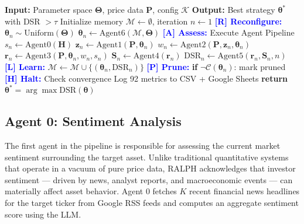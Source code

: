 \documentclass[conference]{IEEEtran}
\begin{document}
\begin{algorithm}[h!]
\caption{The RALPH Loop}
\label{alg:ralph}
\begin{algorithmic}[1]
\State \textbf{Input:} Parameter space $\boldsymbol{\Theta}$, price data $\mathbf{P}$, config $\mathcal{K}$
\State \textbf{Output:} Best strategy $\boldsymbol{\theta}^*$ with DSR $> \tau$
\State Initialize memory $\mathcal{M} \leftarrow \emptyset$, iteration $n \leftarrow 1$
    \State \textcolor{blue}{\textbf{[R] Reconfigure:}}
        \State $\boldsymbol{\theta}_n \sim \text{Uniform}(\boldsymbol{\Theta})$ 
    \Else
        \State $\boldsymbol{\theta}_n \leftarrow \text{Agent6}(\mathcal{M}, \boldsymbol{\Theta})$ 
    \EndIf
    \State \textcolor{blue}{\textbf{[A] Assess:}} Execute Agent Pipeline
    \State $s_n \leftarrow \text{Agent0}(\mathbf{H})$ 
    \State $\mathbf{z}_n \leftarrow \text{Agent1}(\mathbf{P}, \boldsymbol{\theta}_n)$ 
    \State $w_n \leftarrow \text{Agent2}(\mathbf{P}, \mathbf{z}_n, \boldsymbol{\theta}_n)$ 
    \State $\mathbf{r}_n \leftarrow \text{Agent3}(\mathbf{P}, \boldsymbol{\theta}_n, w_n, s_n)$ 
    \State $\mathbf{S}_n \leftarrow \text{Agent4}(\mathbf{r}_n)$ 
    \State $\text{DSR}_n \leftarrow \text{Agent5}(\mathbf{r}_n, \mathbf{S}_n, n)$ 
    \State \textcolor{blue}{\textbf{[L] Learn:}} $\mathcal{M} \leftarrow \mathcal{M} \cup \{(\boldsymbol{\theta}_n, \text{DSR}_n)\}$
    \State \textcolor{blue}{\textbf{[P] Prune:}} \textbf{if} $\neg\mathcal{C}(\boldsymbol{\theta}_n)$: mark pruned
    \State \textcolor{blue}{\textbf{[H] Halt:}} Check convergence
    \State Log 92 metrics to CSV + Google Sheets
\EndWhile
\State \textbf{return} $\boldsymbol{\theta}^* = \arg\max \text{DSR}(\boldsymbol{\theta})$
\end{algorithmic}
\end{algorithm}

\subsection{Agent 0: Sentiment Analysis}

The first agent in the pipeline is responsible for assessing the current market sentiment surrounding the target asset. Unlike traditional quantitative systems that operate in a vacuum of pure price data, RALPH acknowledges that investor sentiment --- driven by news, analyst reports, and macroeconomic events --- can materially affect asset behavior. Agent 0 fetches $K$ recent financial news headlines for the target ticker from Google RSS feeds and computes an aggregate sentiment score using the LLM.
\end{document}
